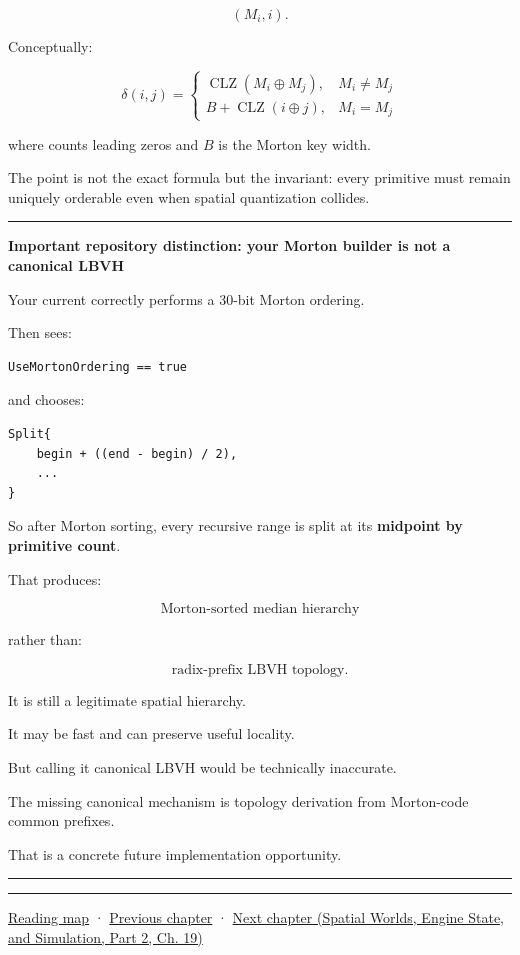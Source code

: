 \[
(M_i,i).
\]

Conceptually:

\[
\delta(i,j)
=
\begin{cases}
\operatorname{CLZ}(M_i\oplus M_j), & M_i\ne M_j\\
B+\operatorname{CLZ}(i\oplus j), & M_i=M_j
\end{cases}
\]

where  counts leading zeros and \(B\) is the Morton key width.

The point is not the exact formula but the invariant: every primitive must remain uniquely orderable even when spatial quantization collides.

\begin{center}\rule{0.5\linewidth}{0.5pt}\end{center}

\textbf{Important repository distinction: your Morton builder is not a canonical LBVH}

Your current  correctly performs a 30-bit Morton ordering.

Then  sees:

\begin{verbatim}
UseMortonOrdering == true
\end{verbatim}

and chooses:

\begin{verbatim}
Split{
    begin + ((end - begin) / 2),
    ...
}
\end{verbatim}

So after Morton sorting, every recursive range is split at its \textbf{midpoint by primitive count}.

That produces:

\[
\boxed{\text{Morton-sorted median hierarchy}}
\]

rather than:

\[
\boxed{\text{radix-prefix LBVH topology}}.
\]

It is still a legitimate spatial hierarchy.

It may be fast and can preserve useful locality.

But calling it canonical LBVH would be technically inaccurate.

The missing canonical mechanism is topology derivation from Morton-code common prefixes.

That is a concrete future implementation opportunity.

\begin{center}\rule{0.5\linewidth}{0.5pt}\end{center}

\begin{center}\rule{0.5\linewidth}{0.5pt}\end{center}

\hyperref[volume-reading-map]{Reading map} · \hyperref[06-engine-ii-ch026-descriptor-arrays-and-backend-limits]{Previous chapter} · \href{../05-Spatial-Worlds-Engine-State-and-Simulation-P02/main.pdf\#nameddest=06-engine-ii-ch028-bvh-traversal-refitting-and-simd}{Next chapter (Spatial Worlds, Engine State, and Simulation, Part 2, Ch. 19)}
